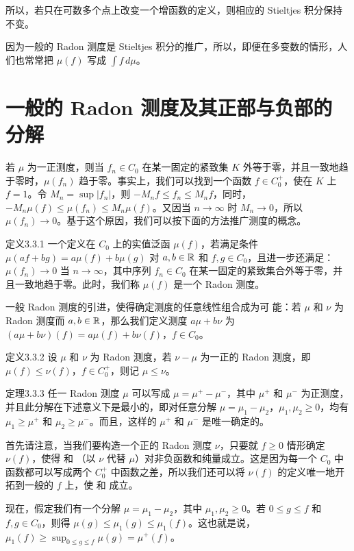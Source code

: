 所以，若只在可数多个点上改变一个增函数的定义，则相应的 Stieltjes 积分保持不变。

因为一般的 Radon 测度是 Stieltjes 积分的推广，所以，即便在多变数的情形，人们也常常把 $\mu(f)$ 写成 $\int f\,d\mu$。
\section{一般的 Radon 测度及其正部与负部的分解}
若 $\mu$ 为一正测度，则当 $f_n\in C_0$ 在某一固定的紧致集 $K$ 外等于零，并且一致地趋于零时，$\mu(f_n)$ 趋于零。事实上，我们可以找到一个函数 $f\in C_0^+$，使在 $K$ 上 $f=1$。令 $M_n=\sup|f_n|$，则 $-M_nf\le f_n\le M_nf$，同时，$-M_n\mu(f)\le\mu(f_n)\le M_n\mu(f)$。又因当 $n\to\infty$ 时 $M_n\to0$，所以 $\mu(f_n)\to0$。基于这个原因，我们可以按下面的方法推广测度的概念。
\begin{statement}{定义}{3.3.1}
一个定义在 $C_0$ 上的实值泛函 $\mu(f)$，若满足条件 $\mu(af+bg)=a\mu(f)+b\mu(g)$ 对 $a,b\in\mathbb R$ 和 $f,g\in C_0$，且进一步还满足：$\mu(f_n)\to0$ 当 $n\to\infty$，其中序列 $f_n\in C_0$ 在某一固定的紧致集合外等于零，并且一致地趋于零。此时，我们称 $\mu(f)$ 是一个 Radon 测度。
\end{statement}
一般 Radon 测度的引进，使得确定测度的任意线性组合成为可
能：若 $\mu$ 和 $\nu$ 为 Radon 测度而 $a,b\in\mathbb R$，那么我们定义测度 $a\mu+b\nu$ 为 $(a\mu+b\nu)(f)=a\mu(f)+b\nu(f)$，$f\in C_0$。
\begin{statement}{定义}{3.3.2}
设 $\mu$ 和 $\nu$ 为 Radon 测度，若 $\nu-\mu$ 为一正的 Radon 测度，即 $\mu(f)\le\nu(f)$，$f\in C_0^+$，则记 $\mu\le\nu$。
\end{statement}
\begin{statement}{定理}{3.3.3}
任一 Radon 测度 $\mu$ 可以写成 $\mu=\mu^+-\mu^-$，其中 $\mu^+$ 和 $\mu^-$ 为正测度，并且此分解在下述意义下是最小的，即对任意分解 $\mu=\mu_1-\mu_2$，$\mu_1,\mu_2\ge0$，均有 $\mu_1\ge\mu^+$ 和 $\mu_2\ge\mu^-$。而且，这样的 $\mu^+$ 和 $\mu^-$ 是唯一确定的。
\end{statement}
\Proof 首先请注意，当我们要构造一个正的 Radon 测度 $\nu$，只要就 $f\ge0$ 情形确定 $\nu(f)$，使得  和 （以 $\nu$ 代替 $\mu$）对非负函数和纯量成立。这是因为每一个 $C_0$ 中函数都可以写成两个 $C_0^+$ 中函数之差，所以我们还可以将 $\nu(f)$ 的定义唯一地开拓到一般的 $f$ 上，使  和  成立。

现在，假定我们有一个分解 $\mu=\mu_1-\mu_2$，其中 $\mu_1,\mu_2\ge0$。若 $0\le g\le f$ 和 $f,g\in C_0$，则得 $\mu(g)\le\mu_1(g)\le\mu_1(f)$。这也就是说，$\mu_1(f)\ge\sup_{0\le g\le f}\mu(g)=\mu^+(f)$。

